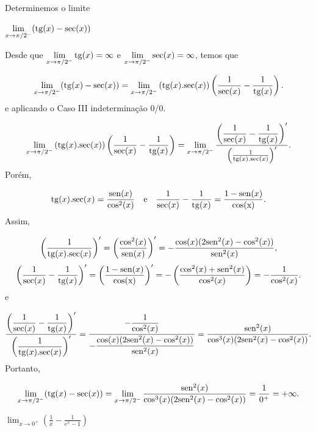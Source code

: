\cleardoublepage\documentclass[../main.tex]{subfiles}
\begin{document}
\begin{exeresol}
Determinemos o limite
\begin{compactenum}[a)]
\item \( \lim \limits_{x\to \pi/2^-}({\rm tg}(x)-{\rm sec}(x)) \)\\

\begin{resol}
Desde que \(\lim \limits_{x\to \pi/2^-}{\rm tg}(x)=\infty\) e \(\lim \limits_{x\to \pi/2^-}{\rm sec}(x)=\infty\), temos que

\[ \lim \limits_{x\to \pi/2^-}({\rm tg}(x)-{\rm sec}(x))=\lim \limits_{x\to \pi/2^-}\left({\rm tg}(x).{\rm sec}(x)\right)\left(\dfrac{1}{{\rm sec}(x)} -\dfrac{1}{{\rm tg}(x)}\right). \]
e aplicando o Caso III indeterminação 0/0.

\[ \lim \limits_{x\to \pi/2^-}\left({\rm tg}(x).{\rm sec}(x)\right)\left(\dfrac{1}{{\rm sec}(x)} -\dfrac{1}{{\rm tg}(x)}\right)=\lim \limits_{x\to \pi/2^-}\frac{\left(\dfrac{1}{{\rm sec}(x)} -\dfrac{1}{{\rm tg}(x)}\right)'}{\left(\frac{1}{{\rm tg}(x).{\rm sec}(x)}\right)'}. \]
Porém,

\[ {\rm tg}(x).{\rm sec}(x)= \frac{{\rm sen}(x)}{{\rm cos}^2(x)} \quad \mbox{e}\quad \dfrac{1}{{\rm sec}(x)} -\dfrac{1}{{\rm tg}(x)}=\dfrac{1-{\rm sen}(x)}{{\rm cos(x)}}. \]
Assim,

\[ \left(\frac{1}{{\rm tg}(x).{\rm sec}(x)}\right)'=\left( \frac{{\rm cos}^2(x)}{{\rm sen}(x)}\right)'= -\frac{\cos (x)(2{\rm sen}^2(x)-\cos^2(x))}{{\rm sen }^2(x)}, \] \[ \left(\dfrac{1}{{\rm sec}(x)} -\dfrac{1}{{\rm tg}(x)}\right)'=\left(\dfrac{1-{\rm sen}(x)}{{\rm cos(x)}}\right)'=-\left(\frac{\cos^2(x)+{\rm sen}^2(x)}{{\rm cos}^2(x)}\right)=-\frac{1}{\cos^2(x)}. \]
e

\[ \dfrac{\left(\dfrac{1}{{\rm sec}(x)} -\dfrac{1}{{\rm tg}(x)}\right)'} {\left(\dfrac{1}{{\rm tg}(x).{\rm sec}(x)}\right)'}=\dfrac{-\dfrac{1}{\cos^2(x)}}{-\dfrac{\cos (x)(2{\rm sen}^2(x)-\cos^2(x))}{{\rm sen }^2(x)}}=\dfrac{{\rm sen }^2(x)}{\cos^3 (x)(2{\rm sen}^2(x)-\cos^2(x))}. \]
Portanto,

\[ \lim \limits_{x\to \pi/2^-}({\rm tg}(x)-{\rm sec}(x))=\lim \limits_{x\to \pi/2^-}\dfrac{{\rm sen }^2(x)}{\cos^3 (x)(2{\rm sen}^2(x)-\cos^2(x))}= \dfrac{1}{0^+}=+ \infty. \]
\end{resol}
\item \(  \lim_{x\to 0^+} \left(\frac{1}{x} - \frac{1}{e^x-1}\right)\)\\


\end{compactenum}
\end{exeresol}
\end{document}
